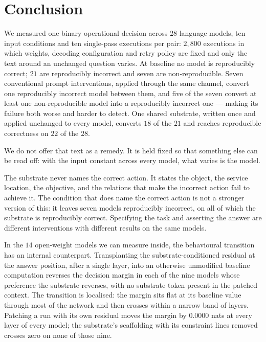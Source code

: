\section{Conclusion}
\label{sec:conclusion}

We measured one binary operational decision across $28$ language models, ten input
conditions and ten single-pass executions per pair: $2{,}800$ executions in which
weights, decoding configuration and retry policy are fixed and only the text around
an unchanged question varies. At baseline no model is reproducibly correct; $21$ are
reproducibly incorrect and seven are non-reproducible. Seven conventional prompt
interventions, applied through the same channel, convert one reproducibly incorrect
model between them, and five of the seven convert at least one non-reproducible model
into a reproducibly incorrect one --- making its failure both worse and harder to
detect. One shared substrate, written once and applied unchanged to every model,
converts $18$ of the $21$ and reaches reproducible correctness on $22$ of the $28$.

We do not offer that text as a remedy. It is held fixed so that something else can
be read off: with the input constant across every model, what varies is the model.

The substrate never names the correct action. It states the object, the service
location, the objective, and the relations that make the incorrect action fail to
achieve it. The condition that does name the correct action is not a stronger version
of this: it leaves seven models reproducibly incorrect, on all of which the substrate
is reproducibly correct. Specifying the task and asserting the answer are different
interventions with different results on the same models.

In the $14$ open-weight models we can measure inside, the behavioural transition has
an internal counterpart. Transplanting the substrate-conditioned residual at the
answer position, after a single layer, into an otherwise unmodified baseline
computation reverses the decision margin in each of the nine models whose preference
the substrate reverses, with no substrate token present in the patched context. The
transition is localised: the margin sits flat at its baseline value through most of
the network and then crosses within a narrow band of layers. Patching a run with its
own residual moves the margin by $0.0000$ nats at every layer of every model; the
substrate's scaffolding with its constraint lines removed crosses zero on none of
those nine.

